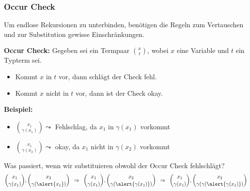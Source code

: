 \documentclass{beamer}
\begin{document}
\begin{frame} \frametitle{Occur Check}
	\footnotesize
	Um endlose Rekursionen zu unterbinden, benötigen die Regeln zum Vertauschen und zur Substitution gewisse Einschränkungen. 
		
	\textbf{Occur Check:}
	Gegeben sei ein Termpaar $\binom{x}{t}$, wobei $x$ eine Variable und $t$ ein Typterm sei.
	\vspace{-.5\baselineskip}
	\begin{itemize} 
		\item Kommt $x$ in $t$ vor, dann schlägt der Check fehl.
		\item Kommt $x$ nicht in $t$ vor, dann ist der Check okay.
	\end{itemize}
	\pause
	
	\textbf{Beispiel:}
	\begin{itemize}
		\item $\displaystyle\binom{x_1}{\gamma(x_1)} \leadsto$ Fehlschlag, da $x_1$ in $\gamma(x_1)$ vorkommt
		\item $\displaystyle\binom{x_1}{\gamma(x_2)} \leadsto$ okay, da $x_1$ nicht in $\gamma(x_2)$ vorkommt
	\end{itemize}
	\pause	

	Was passiert, wenn wir substituieren obwohl der Occur Check fehlschlägt?
	\begin{equation*}
		\binom{x_1}{\gamma(x_1)}, \binom{x_2}{\gamma(\alert{x_1})}
		\follows
		\binom{x_1}{\gamma(x_1)}, \binom{x_2}{\gamma(\alert{\gamma(x_1)})}
		\follows
		\binom{x_1}{\gamma(x_1)}, \binom{x_2}{\gamma(\gamma(\alert{\gamma(x_1)})}
	\end{equation*}
\end{frame}
\end{document}
